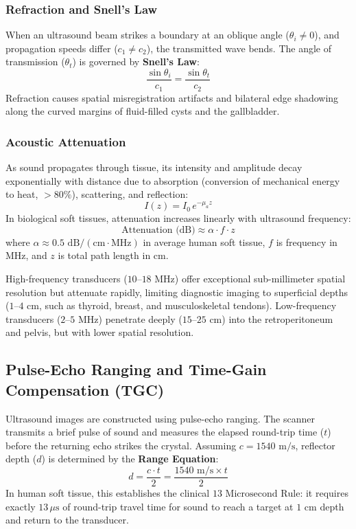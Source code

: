 \documentclass[11pt,a4paper]{article}
\begin{document}
\subsubsection{Refraction and Snell's Law}
When an ultrasound beam strikes a boundary at an oblique angle ($\theta_i \ne 0$), and propagation speeds differ ($c_1 \ne c_2$), the transmitted wave bends. The angle of transmission ($\theta_t$) is governed by \textbf{Snell's Law}:
\begin{equation}
    \frac{\sin\theta_i}{c_1} = \frac{\sin\theta_t}{c_2}
\end{equation}
Refraction causes spatial misregistration artifacts and bilateral edge shadowing along the curved margins of fluid-filled cysts and the gallbladder.

\subsubsection{Acoustic Attenuation}
As sound propagates through tissue, its intensity and amplitude decay exponentially with distance due to absorption (conversion of mechanical energy to heat, $>80\%$), scattering, and reflection:
\begin{equation}
    I(z) = I_0 \, e^{-\mu_a z}
\end{equation}
In biological soft tissues, attenuation increases linearly with ultrasound frequency:
\begin{equation}
    \text{Attenuation (dB)} \approx \alpha \cdot f \cdot z
\end{equation}
where $\alpha \approx 0.5\text{ dB}/(\text{cm}\cdot\text{MHz})$ in average human soft tissue, $f$ is frequency in MHz, and $z$ is total path length in cm.

\begin{clinicalpearl}
High-frequency transducers ($10\text{--}18\text{ MHz}$) offer exceptional sub-millimeter spatial resolution but attenuate rapidly, limiting diagnostic imaging to superficial depths ($1\text{--}4\text{ cm}$, such as thyroid, breast, and musculoskeletal tendons). Low-frequency transducers ($2\text{--}5\text{ MHz}$) penetrate deeply ($15\text{--}25\text{ cm}$) into the retroperitoneum and pelvis, but with lower spatial resolution.
\end{clinicalpearl}

\subsection{Pulse-Echo Ranging and Time-Gain Compensation (TGC)}
Ultrasound images are constructed using pulse-echo ranging. The scanner transmits a brief pulse of sound and measures the elapsed round-trip time ($t$) before the returning echo strikes the crystal. Assuming $c = 1540\text{ m/s}$, reflector depth ($d$) is determined by the \textbf{Range Equation}:
\begin{equation}
    d = \frac{c \cdot t}{2} = \frac{1540\text{ m/s} \times t}{2}
\end{equation}
In human soft tissue, this establishes the clinical \textbf{$13\text{ Microsecond Rule}$}: it requires exactly $13\,\mu\text{s}$ of round-trip travel time for sound to reach a target at $1\text{ cm}$ depth and return to the transducer.
\end{document}
